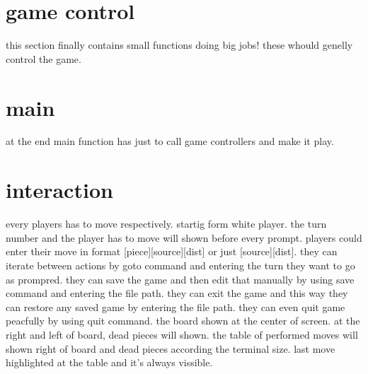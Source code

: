 \documentclass[11pt]{article} %
\begin{document}
\section{game control}
this section finally contains small functions doing big jobs! these whould genelly control the game.

\section{main}
at the end main function has just to call game controllers and make it play.


\section{interaction}
every players has to move respectively. startig form white player. the turn number and the player has to move will shown before every prompt. players could enter their move in format [piece][source][dist] or just [source][dist]. they can iterate between actions by goto command and entering the turn they want to go as prompred. they can save the game and then edit that manually by using save command and entering the file path.
they can exit the game and this way they can restore any saved game by entering the file path.
they can even quit game peacfully by using quit command.
the board shown at the center of screen. at the right and left of board, dead pieces will shown. the table of performed moves will shown right of board and dead pieces according the terminal size. last move highlighted at the table and it's always vissible.
\end{document}
